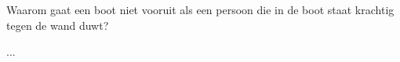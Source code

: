 
\begin{exercise}



Waarom gaat een boot niet vooruit als een persoon die in de boot staat krachtig tegen de wand duwt?


\begin{oplossing}
...
\end{oplossing}

\end{exercise}
